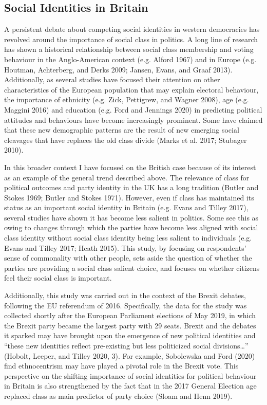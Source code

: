 \documentclass[a4paper]{cupjournal}
\begin{document}
\hypertarget{social-identities-in-britain}{%
\subsection{Social Identities in Britain}\label{social-identities-in-britain}}

A persistent debate about competing social identities in western democracies has revolved around the importance of social class in politics. A long line of research has shown a historical relationship between social class membership and voting behaviour in the Anglo-American context (e.g. Alford 1967) and in Europe (e.g. Houtman, Achterberg, and Derks 2009; Jansen, Evans, and Graaf 2013). Additionally, as several studies have focused their attention on other characteristics of the European population that may explain electoral behaviour, the importance of ethnicity (e.g. Zick, Pettigrew, and Wagner 2008), age (e.g. Maggini 2016) and education (e.g. Ford and Jennings 2020) in predicting political attitudes and behaviours have become increasingly prominent. Some have claimed that these new demographic patterns are the result of new emerging social cleavages that have replaces the old class divide (Marks et al. 2017; Stubager 2010).

In this broader context I have focused on the British case because of its interest as an example of the general trend described above. The relevance of class for political outcomes and party identity in the UK has a long tradition (Butler and Stokes 1969; Butler and Stokes 1971). However, even if class has maintained its status as an important social identity in Britain (e.g. Evans and Tilley 2017), several studies have shown it has become less salient in politics. Some see this as owing to changes through which the parties have become less aligned with social class identity without social class identity being less salient to individuals (e.g. Evans and Tilley 2017; Heath 2015). This study, by focusing on respondents' sense of commonality with other people, sets aside the question of whether the parties are providing a social class salient choice, and focuses on whether citizens feel their social class is important.

Additionally, this study was carried out in the context of the Brexit debates, following the EU referendum of 2016. Specifically, the data for the study was collected shortly after the European Parliament elections of May 2019, in which the Brexit party became the largest party with 29 seats. Brexit and the debates it sparked may have brought upon the emergence of new political identities and ``these new identities reflect pre-existing but less politicized social divisions\ldots{}'' (Hobolt, Leeper, and Tilley 2020, 3). For example, Sobolewska and Ford (2020) find ethnocentrism may have played a pivotal role in the Brexit vote. This perspective on the shifting importance of social identities for political behaviour in Britain is also strengthened by the fact that in the 2017 General Election age replaced class as main predictor of party choice (Sloam and Henn 2019).
\end{document}
